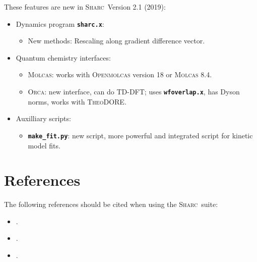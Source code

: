 \documentclass[a4paper,10pt,DIV=15,openany]{scrbook}
\newcommand{\sharc}{\textsc{Sharc}}
\newcommand{\ttt}[1]{\textbf{\texttt{#1}}}
\begin{document}
These features are new in \sharc\ Version 2.1 (2019):
\begin{itemize}
  \item Dynamics program \ttt{sharc.x}:
  \begin{itemize}
    \item New methods: Rescaling along gradient difference vector.
  \end{itemize}
  \item Quantum chemistry interfaces:
  \begin{itemize}
    \item \textsc{Molcas}: works with \textsc{Openmolcas} version 18 or \textsc{Molcas} 8.4.
    \item \textsc{Orca}: new interface, can do TD-DFT; uses \ttt{wfoverlap.x}, has Dyson norms, works with \textsc{TheoDORE}.
  \end{itemize}
  \item Auxilliary scripts:
  \begin{itemize}
    \item \ttt{make\_fit.py}: new script, more powerful and integrated script for kinetic model fits.
  \end{itemize}
\end{itemize}






\section{References}

The following references should be cited when using the \sharc\ suite:
{
\newcommand{\enquote}[1]{``#1''}
\begin{shaded}
  \begin{itemize}
    \item \cite{Richter2011JCTC} .
    \item \cite{Mai2018WCMS} .
    \item \cite{Mai2018SHARC} .
  \end{itemize}
\end{shaded}
}
\end{document}
